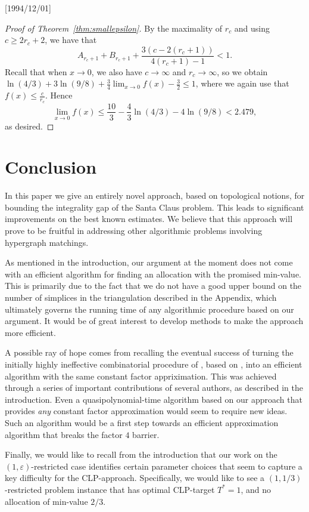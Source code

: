 \NeedsTeXFormat{LaTeX2e}[1994/12/01]\documentclass[letterpaper, 11pt]{article}
\theoremstyle{definition}
\theoremstyle{remark}
\numberwithin{equation}{section}
\begin{document}
\begin{proof}[Proof of Theorem~\ref{thm:smallepsilon}]
By the maximality of $r_{c}$ and using $c
\geq 2r_{c} +2$, we have that 
$$A_{r_{c}+1} + B_{r_{c}+1} + \frac{3(c
  -2(r_{c}+1))}{4(r_{c}+1)-1} < 1.$$
Recall that when $x \rightarrow 0$, we also have $c
\rightarrow \infty$ and $r_{c} \rightarrow
\infty$, so we obtain
$\ln (4/3) + 3 \ln (9/8) + \frac{3}{4} \lim_{x \rightarrow 0}f(x) - \frac{3}{2}
\leq 1$, where we again use that $f(x) \leq \frac{c}{r_c}$.
Hence $$\lim_{x \rightarrow 0} f(x) \leq
\frac{10}{3} - \frac{4}{3} \ln(4/3) - 4\ln
(9/8) < 2.479,$$
as desired.
\end{proof}


\section{Conclusion}

In this paper we give an entirely novel approach, based on topological
notions, for bounding the integrality gap of the Santa Claus problem. 
This leads to significant improvements on the best known estimates. 
We believe that this approach will prove to be fruitful in addressing
other algorithmic problems involving hypergraph matchings.

As mentioned in the introduction, our argument at the moment does
not come with an efficient algorithm for finding an allocation with
the promised min-value. This is primarily due to the fact that
we do not have a good upper bound on the number of simplices in
the triangulation described in the Appendix, which ultimately
governs the running time of any algorithmic procedure
based on our argument. It would be of great interest to develop
methods to make the approach more efficient.

A possible ray of hope comes from recalling the eventual success of turning the
initially highly ineffective combinatorial procedure of
\cite{asadpourfeigesaberi}, based on \cite{haxell}, 
into an efficient algorithm with the same constant factor
appriximation. This was achieved through a series
of important contributions of several authors, as described in the introduction. 
Even a quasipolynomial-time algorithm based on our approach that provides
{\em any} constant factor approximation would seem to require new
ideas.
Such an algorithm would be a first step towards an efficient
approximation algorithm that breaks the factor $4$ barrier.



Finally, we would like to recall from the introduction
that our work on the $(1,\varepsilon)$-restricted case identifies certain
parameter choices that seem to capture a key difficulty for the
CLP-approach.
Specifically, we would like to see a $(1,1/3)$-restricted problem
instance that has optimal CLP-target $T^*=1$, and no allocation of
min-value $2/3$. 
\end{document}
